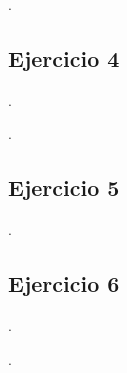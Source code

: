 \vspace*{1em}

\lipsum[1].

\vspace*{2em}


\begin{Enunciado}
\subsection*{Ejercicio 4} 

\lipsum[1].
\end{Enunciado}

\vspace*{1em}

\lipsum[1].

\vspace*{2em}

\begin{Enunciado}
\subsection*{Ejercicio 5}

\lipsum[1].
\end{Enunciado}

\vspace*{1em}
    
\lipsum[1]

\vspace*{2em}


\begin{Enunciado}
\subsection*{Ejercicio 6}

\lipsum[1].
\end{Enunciado}

\vspace*{1em}

\lipsum[1].
    
\vspace*{2em}
